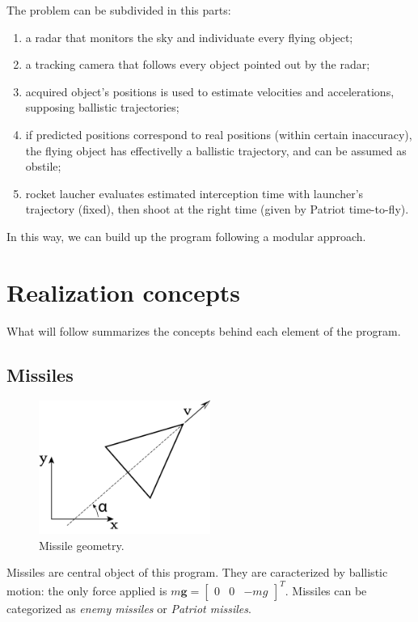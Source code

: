 \documentclass[notitlepage,a4paper,11pt]{article} %
\begin{document}
	The problem can be subdivided in this parts:
	\begin{enumerate}
		\item a radar that monitors the sky and individuate every flying object;
		\item a tracking camera that follows every object pointed out by the radar;
		\item acquired object's positions is used to estimate velocities and accelerations, supposing ballistic trajectories;
		\item if predicted positions correspond to real positions (within certain inaccuracy), the flying object has effectivelly a ballistic trajectory, and can be assumed as obstile;
		\item rocket laucher evaluates estimated interception time with launcher's trajectory (fixed), then shoot at the right time (given by Patriot time-to-fly).
	\end{enumerate}

	In this way, we can build up the program following a modular approach.

\newpage
\section{Realization concepts}

	What will follow summarizes the concepts behind each element of the program.

	\subsection{Missiles}

		\begin{figure}[ht]
		\centering \includegraphics[width=0.5\textwidth]{missile}
			\caption{Missile geometry.}
		\end{figure}

		Missiles are central object of this program. They are caracterized by ballistic motion:
		the only force applied is $m\bm{g} = \begin{bmatrix} 0 & 0 & -mg \end{bmatrix} ^T$.
		Missiles can be categorized as \emph{enemy missiles} or \emph{Patriot missiles}.
\end{document}
